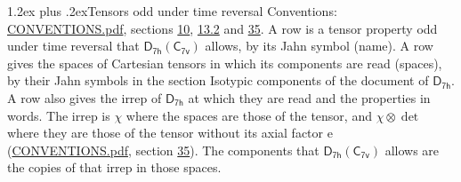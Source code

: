 \documentclass[10pt,a4paper]{article}
\makeatletter
\renewcommand\section{\@startsection{section}{1}{\z@}{-3ex plus -1ex minus -.2ex}%
  {1.2ex plus .2ex}{\normalfont\large\sffamily\bfseries\color{parttitle}}}
\numberwithin{equation}{section}
\newcommand{\grp}[1]{\mathsf{#1}}
\newcommand{\irrprod}{\otimes}
\makeatother
\begin{document}
\section{Tensors odd under time reversal}\label{s:time_odd}
Conventions: \href{../../CONVENTIONS.pdf}{CONVENTIONS.pdf}, sections \href{../../../rotation/CONVENTIONS.pdf\#conv.10}{10}, \href{../../../rotation/CONVENTIONS.pdf\#conv.13.2}{13.2} and \href{../../CONVENTIONS.pdf\#conv.35}{35}.
\leavevmode\label{n:head.name.property}A row is a tensor property odd under time reversal that $\grp{D_{7h}}(\grp{C_{7v}})$ allows, by its Jahn symbol (name). \label{n:head.spaces}A row gives the spaces of Cartesian tensors in which its components are read (spaces), by their Jahn symbols in the section Isotypic components of the document of \href{../../../rotation/data/pdf/D7h.pdf}{$\grp{D_{7h}}$}. \label{n:head.properties}A row also gives the irrep of $\grp{D_{7h}}$ at which they are read and the properties in words. The irrep is $\chi$ where the spaces are those of the tensor, and $\chi \irrprod \det$ where they are those of the tensor without its axial factor e (\href{../../CONVENTIONS.pdf}{CONVENTIONS.pdf}, section \href{../../CONVENTIONS.pdf\#conv.35}{35}). The components that $\grp{D_{7h}}(\grp{C_{7v}})$ allows are the copies of that irrep in those spaces.
\end{document}

